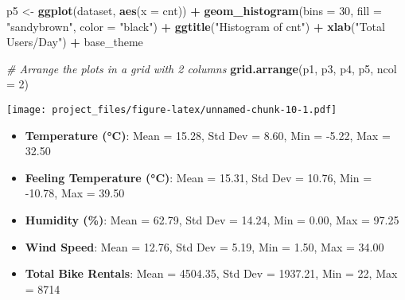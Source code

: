 \documentclass[
]{article}
\newenvironment{Shaded}{\begin{snugshade}}{\end{snugshade}}
\newcommand{\AttributeTok}[1]{\textcolor[rgb]{0.13,0.29,0.53}{#1}}
\newcommand{\CommentTok}[1]{\textcolor[rgb]{0.56,0.35,0.01}{\textit{#1}}}
\newcommand{\DecValTok}[1]{\textcolor[rgb]{0.00,0.00,0.81}{#1}}
\newcommand{\FunctionTok}[1]{\textcolor[rgb]{0.13,0.29,0.53}{\textbf{#1}}}
\newcommand{\NormalTok}[1]{#1}
\newcommand{\OtherTok}[1]{\textcolor[rgb]{0.56,0.35,0.01}{#1}}
\newcommand{\SpecialCharTok}[1]{\textcolor[rgb]{0.81,0.36,0.00}{\textbf{#1}}}
\newcommand{\StringTok}[1]{\textcolor[rgb]{0.31,0.60,0.02}{#1}}
\begin{document}
\begin{Shaded}
\begin{Highlighting}[]
\NormalTok{p5 }\OtherTok{\textless{}{-}} \FunctionTok{ggplot}\NormalTok{(dataset, }\FunctionTok{aes}\NormalTok{(}\AttributeTok{x =}\NormalTok{ cnt)) }\SpecialCharTok{+}
      \FunctionTok{geom\_histogram}\NormalTok{(}\AttributeTok{bins =} \DecValTok{30}\NormalTok{, }\AttributeTok{fill =} \StringTok{"sandybrown"}\NormalTok{, }\AttributeTok{color =} \StringTok{"black"}\NormalTok{) }\SpecialCharTok{+}
      \FunctionTok{ggtitle}\NormalTok{(}\StringTok{"Histogram of cnt"}\NormalTok{) }\SpecialCharTok{+}
      \FunctionTok{xlab}\NormalTok{(}\StringTok{"Total Users/Day"}\NormalTok{) }\SpecialCharTok{+}
\NormalTok{      base\_theme}

\CommentTok{\# Arrange the plots in a grid with 2 columns}
\FunctionTok{grid.arrange}\NormalTok{(p1, p3, p4, p5, }\AttributeTok{ncol =} \DecValTok{2}\NormalTok{)}
\end{Highlighting}
\end{Shaded}

\texttt{[image: project\_files/figure-latex/unnamed-chunk-10-1.pdf]}

\begin{itemize}
\item
  \textbf{Temperature (°C)}: Mean = 15.28, Std Dev = 8.60, Min = -5.22,
  Max = 32.50
\item
  \textbf{Feeling Temperature (°C)}: Mean = 15.31, Std Dev = 10.76, Min
  = -10.78, Max = 39.50
\item
  \textbf{Humidity (\%)}: Mean = 62.79, Std Dev = 14.24, Min = 0.00, Max
  = 97.25
\item
  \textbf{Wind Speed}: Mean = 12.76, Std Dev = 5.19, Min = 1.50, Max =
  34.00
\item
  \textbf{Total Bike Rentals}: Mean = 4504.35, Std Dev = 1937.21, Min =
  22, Max = 8714
\end{itemize}
\end{document}
